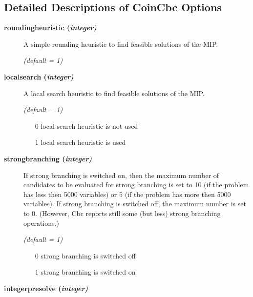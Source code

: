 \subsection{Detailed Descriptions of CoinCbc Options}

\begin{description}

\item[\label{roundingheuristic}\hypertarget{roundingheuristic}
{\textbf{roundingheuristic (\slshape{integer})}}]\hspace{1.0in}

A simple rounding heuristic to find feasible solutions of the MIP.

\textsl{(default = 1)}

\item[\label{localsearch}\hypertarget{localsearch}
{\textbf{localsearch (\slshape{integer})}}]\hspace{1.0in}

A local search heuristic to find feasible solutions of the MIP.

\textsl{(default = 1)}
\begin{itemize}
\item[0] local search heuristic is not used
\item[1] local search heuristic is used
\end{itemize}

\item[\label{strongbranching}\hypertarget{strongbranching}
{\textbf{strongbranching (\slshape{integer})}}]\hspace{1.0in}

If strong branching is switched on, then the maximum number of candidates to be evaluated for strong branching is set to 10 (if the problem has less then 5000 variables) or 5 (if the problem has more then 5000 variables).
If strong branching is switched off, the maximum number is set to 0. (However, Cbc reports still some (but less) strong branching operations.)

\textsl{(default = 1)}
\begin{itemize}
\item[0] strong branching is switched off
\item[1] strong branching is switched on
\end{itemize}

\item[\label{integerpresolve}\hypertarget{integerpresolve}
{\textbf{integerpresolve (\slshape{integer})}}]\hspace{1.0in}


\end{description}
